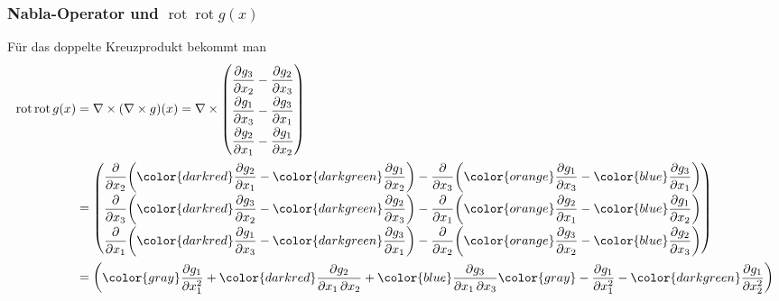 %
%
\subsubsection{Nabla-Operator und $\operatorname{rot}\operatorname{rot}g(x)$}
Für das doppelte Kreuzprodukt bekommt man
\begin{align*}
\operatorname{rot}\operatorname{rot}g(x)
&=
\nabla\times(\nabla \times g)(x)
=
\nabla\times
{\renewcommand{\arraystretch}{1.9}
\begin{pmatrix}
\displaystyle
\frac{\partial g_3}{\partial x_2}-\frac{\partial g_2}{\partial x_3}\\
\displaystyle
\frac{\partial g_1}{\partial x_3}-\frac{\partial g_3}{\partial x_1}\\
\displaystyle
\frac{\partial g_2}{\partial x_1}-\frac{\partial g_1}{\partial x_2}
\end{pmatrix}}
\\
&=
{\renewcommand{\arraystretch}{1.9}
\begin{pmatrix}
\displaystyle
\frac{\partial}{\partial x_2}
\biggl(
{\color{darkred}\frac{\partial g_2}{\partial x_1}}-
{\color{darkgreen}\frac{\partial g_1}{\partial x_2}}
\biggr)
-
\frac{\partial}{\partial x_3}
\biggl(
{\color{orange}\frac{\partial g_1}{\partial x_3}}-
{\color{blue}\frac{\partial g_3}{\partial x_1}}
\biggr)
\\
\displaystyle
\frac{\partial}{\partial x_3}
\biggl(
{\color{darkred}\frac{\partial g_3}{\partial x_2}}-
{\color{darkgreen}\frac{\partial g_2}{\partial x_3}}
\biggr)
-
\frac{\partial}{\partial x_1}
\biggl(
{\color{orange}\frac{\partial g_2}{\partial x_1}}-
{\color{blue}\frac{\partial g_1}{\partial x_2}}
\biggr)
\\
\displaystyle
\frac{\partial}{\partial x_1}
\biggl(
{\color{darkred}\frac{\partial g_1}{\partial x_3}}-
{\color{darkgreen}\frac{\partial g_3}{\partial x_1}}
\biggr)
-
\frac{\partial}{\partial x_2}
\biggl(
{\color{orange}\frac{\partial g_3}{\partial x_2}}-
{\color{blue}\frac{\partial g_2}{\partial x_3}}
\biggr)
\end{pmatrix}}
\\
&=
{\renewcommand{\arraystretch}{1.9}
\begin{pmatrix}
\displaystyle
{\color{gray}\frac{\partial g_1}{\partial x_1^2}}
+
{\color{darkred}\frac{\partial g_2}{\partial x_1\,\partial x_2}}
+{\color{blue}\frac{\partial g_3}{\partial x_1\,\partial x_3}}
{\color{gray}\mathstrut-\frac{\partial g_1}{\partial x_1^2}}
-{\color{darkgreen}\frac{\partial g_1}{\partial x_2^2}}

\end{pmatrix}}
\end{align*}
